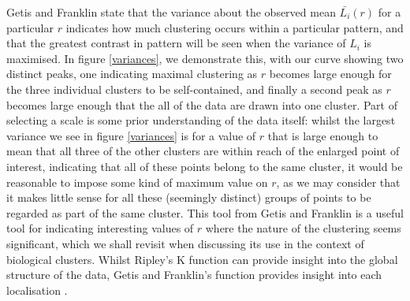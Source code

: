 \documentclass[11pt]{article}
\begin{document}
Getis and Franklin \cite{getisAndFranklin} state that the variance about the observed mean $\bar{L_i}(r)$ for a particular $r$ indicates how much clustering occurs within a particular pattern, and that the greatest contrast in pattern will be seen when the variance of $L_i$ is maximised. In figure \ref{variances}, we demonstrate this, with our curve showing two distinct peaks, one indicating maximal clustering as $r$ becomes large enough for the three individual clusters to be self-contained, and finally a second peak as $r$ becomes large enough that the all of the data are drawn into one cluster. Part of selecting a scale is some prior understanding of the data itself: whilst the largest variance we see in figure \ref{variances} is for a value of $r$ that is large enough to mean that all three of the other clusters are within reach of the enlarged point of interest, indicating that all of these points belong to the same cluster, it would be reasonable to impose some kind of maximum value on $r$, as we may consider that it makes little sense for all these (seemingly distinct) groups of points to be regarded as part of the same cluster.
This tool from Getis and Franklin is a useful tool for indicating interesting values of $r$ where the nature of the clustering seems significant, which we shall revisit when discussing its use in the context of biological clusters. Whilst Ripley's K function can provide insight into the global structure of the data, Getis and Franklin's function provides insight into each localisation \cite{Khater2020}. 
\end{document}
